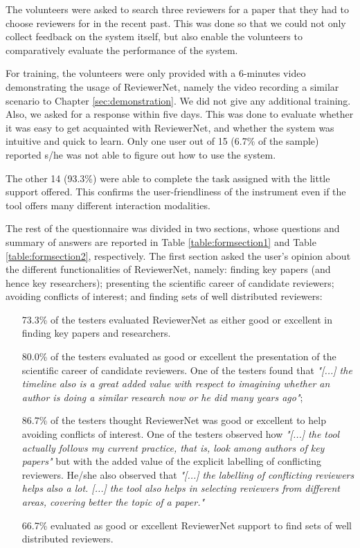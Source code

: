 The volunteers were asked to search three reviewers for a paper that they had to choose reviewers for in the recent past. This was done so that we could not only collect feedback on the system itself, but also enable the volunteers to comparatively evaluate the performance of the system.

For training, the volunteers were only provided with a 6-minutes video demonstrating the usage of ReviewerNet, namely the video recording a similar scenario to Chapter \ref{sec:demonstration}. We did not give any additional training. Also, we asked for a response within five days. This was done to evaluate whether it was easy to get acquainted with ReviewerNet, and whether the system was intuitive and quick to learn. Only one user out of 15 (6.7\% of the sample) reported s/he was not able to figure out how to use the system. 

The other 14 (93.3\%) were able to complete the task assigned with the little support offered. This confirms the user-friendliness of the instrument even if the tool offers many different interaction modalities.

The rest of the questionnaire was divided in two sections, whose questions and summary of answers are reported in Table \ref{table:formsection1} and Table \ref{table:formsection2}, respectively. The first section asked the user's opinion about the different functionalities of ReviewerNet, namely: finding key papers (and hence key researchers); presenting the scientific career of candidate reviewers; avoiding conflicts of interest; and finding sets of well distributed reviewers:%
\begin{itemize}
\item [73.3\%] of the testers evaluated ReviewerNet as either good or excellent in finding key papers and researchers. 
\item [80.0\%] of the testers evaluated as good or excellent the presentation of the scientific career of candidate reviewers. One of the testers found that {\em "[...] the timeline also is a great added value with respect to imagining whether an author is doing a similar research now or he did many years ago"};
\item [ 86.7\%] of the testers thought ReviewerNet was good or excellent to help avoiding conflicts of interest. One of the testers observed how {\em "[...] the tool actually follows my current practice, that is, look among authors of key papers"} but with the added value of the explicit labelling of conflicting reviewers. He/she also observed that {\em "[...] the labelling of conflicting reviewers helps also a lot. [...] the tool also helps in selecting reviewers from different areas, covering better the topic of a paper."}
\item [ 66.7\%] evaluated as good or excellent ReviewerNet support to find sets of well distributed reviewers. 
\end{itemize}

